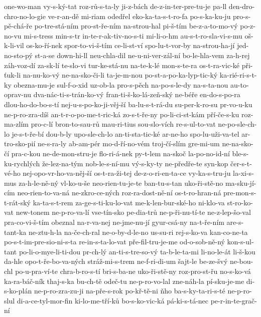 {one-wo-man
vy-s-ký-tat
roz-rů-s-ta-ly
ji-z-bách
de-z-in-ter-pre-tu-je
pa-ll
den-dro-chro-no-lo-gie
ve-r-an-dě
mi-riam
odedřel
eko-ka-ta-s-t-ro-fa
po-s-ka-ku-ju
pro-s-pě-chá-ře
po-tre-stá-ním
pro-st-ře-ním
na-strou-hal
pi-š-tím
be-z-a-to-mo-vý
po-z-no-vu
mi-s-tress
min-s-tr
in-te-r-ak-tiv-no-s-ti
mi-li-o-hm
au-s-t-ro-sla-vi-s-mu
oš-k-li-vil
os-ko-ří-nek
spor-to-vi-š-tím
ce-li-st-ví
spo-lu-t-vor-by
na-strou-ha-jí
jed-no-sto-pý
st-a-se
down-hi-ll
neu-chla-dil
ne-u-ni-ver-zál-ní
bo-le-hla-vem
za-h-rej
záh-voz-dí
za-sk-lí
te-slo-vi
tur-ke-stá-nu
na-te-k-lé
mon-s-te-ra
os-t-ra-vic-ké
při-ťuk-li
na-nu-ko-vý
ne-na-sko-či-li
ta-je-m-nou
po-st-a-po-ka-lyp-tic-ký
ka-rié-ri-s-t-ky
obezna-mu-je
sul-f-o-xid
uz-ob-la
pro-s-pěch
na-po-s-le-dy
na-s-ta-nou
au-to-oprav-nu
dva-nác-ti-s-trán-ko-vý
fran-ti-š-ko-lá-zeň-ský
ne-béře
en-do-s-po-ra
dlou-ho-do-bo-s-tí
nej-u-s-po-ko-ji-věj-ší
ba-lu-s-t-rá-du
su-per-k-ro-su
pr-vo-u-ku
ne-p-ro-zra-díš
an-t-r-o-po-me-t-ric-ká
zo-s-t-ře-ny
po-li-ci-st-kám
pří-če-s-ku
roz-ma-zlím
pro-c-lí
bron-to-sau-rů
mau-ri-tius
sou-slo-vích
re-s-ul-to-vat
ne-po-sle-ch-lo
je-s-t-ře-bí
dou-b-ly
upo-sle-ch-lo
an-ti-sta-tic-ké
ar-ne-ho
spo-lu-uži-va-tel
ar-tro-sko-pií
ne-s-ra-ly
ab-am-pér
mo-d-ří-no-vém
troj-čí-slím
gre-mi-um
ne-na-sko-čí
pra-c-kou
ne-de-mon-stru-je
flo-ri-á-nek
py-t-lem
na-skoč
la-po-no-id-ní
ble-s-ku-rychlých
že-lez-na-tým
nob-le-s-ní-mu
vý-s-ky-ty
ne-předře-te
syn-kop
čer-s-t-vé-ho
nej-opo-vr-ho-va-něj-ší
os-t-ra-ži-tej
de-z-o-ri-en-ta-ce
vy-ka-s-tru-ju
la-xi-s-mus
za-h-le-ně-ný
vl-ko-u-še
neo-rien-tu-je-te
ban-tu-s-tan
uko-ři-stě-no
ma-sku-jí-cím
neo-rien-to-va-ná
ne-zkro-ce-ných
roz-ra-dost-ně-ní
os-t-ro-hran-ná
pre-mon-s-t-rát-ský
ka-ta-s-t-rem
za-ge-s-ti-ku-lo-vat
me-k-len-bur-ské-ho
ni-klo-va
st-ro-ko-vat
new-tonem
ne-p-ro-va-lí
vse-tín-sko
pe-dia-trů
ne-p-ři-nu-tí-te
ne-z-lep-šo-val
pra-co-vi-š-tím
obeznal
na-r-va-nej
ne-jme-nu-jí
gyur-csá-ny
na-t-ře-ním
are-s-tant-ka
ne-ztu-h-la
na-če-ch-ral
ne-o-by-d-le-no
us-su-ri
rej-s-ko-va
kan-co-ne-ta
po-s-t-im-pre-sio-ni-s-ta
re-in-s-ta-lo-vat
pře-fil-tru-je-me
od-o-sob-ně-ný
kon-s-ul-tant
po-li-o-mye-li-ti-dou
pr-ch-lý
an-ti-s-tre-so-vý
ta-b-le-ta-mi
li-no-le-át
li-š-kou
da-hle
opo-t-ře-bo-va-ných
stráž-mi-s-trem
ne-f-ri-di-um
šajt-le
be-ze-švý
ne-bou-chl
po-u-pra-ví-te
chra-b-ro-s-tí
bri-s-ba-ne
uko-ři-stě-ny
roz-pro-st-řu
no-s-ko-vá
ka-ra-báč-ník
thaj-s-ka
bu-ch-tě
odeč-tu
ne-p-ro-vo-lal
zne-náh-la
pí-sku-je-me
di-s-ko-plán
ne-p-ro-zra-zu-ji
na-pře-s-rok
po-kř-tě-ni
ňho
ba-s-ky-ta-ri-s-té
ne-p-ro-slul
di-a-ce-tyl-mor-fin
ki-lo-me-tří-ků
bo-s-ko-vic-ká
pá-ki-s-tá-nec
pe-r-in-te-grač-ní
}
